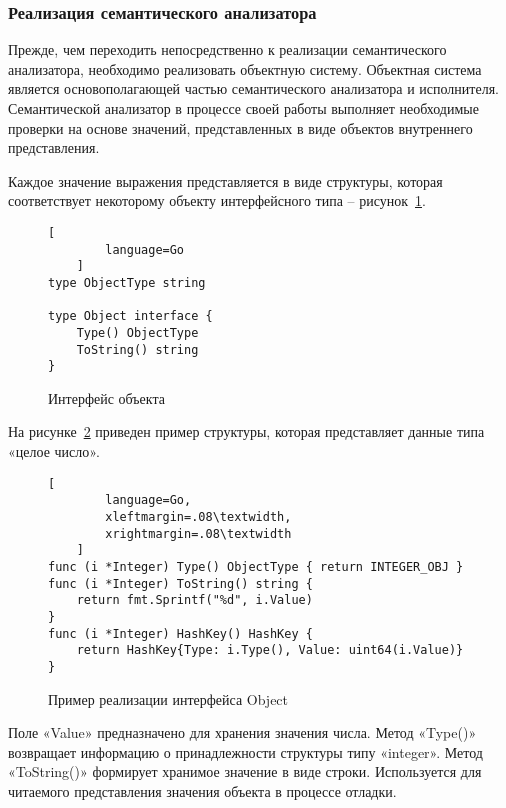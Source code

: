 \subsubsection{Реализация семантического анализатора}

Прежде, чем переходить непосредственно к реализации семантического анализатора, необходимо реализовать объектную систему.
Объектная система является основополагающей частью семантического анализатора и исполнителя.
Семантической анализатор в процессе своей работы выполняет необходимые проверки на основе значений,
представленных в виде объектов внутреннего представления.

Каждое значение выражения представляется в виде структуры, которая соответствует некоторому объекту интерфейсного типа -- рисунок~\ref{f:code_ObjectInterface}.

\begin{figure}[ht]
	\centering
	\vspace{\toppaddingoffigure}
	\begin{lstlisting}[
        language=Go
    ]
type ObjectType string

type Object interface {
    Type() ObjectType
    ToString() string
}
\end{lstlisting}
	\caption{Интерфейс объекта}
	\label{f:code_ObjectInterface}
\end{figure}

На рисунке~\ref{f:code_IObjectExample} приведен пример структуры, которая представляет данные типа «целое число».

\begin{figure}[ht]
	\centering
	\vspace{\toppaddingoffigure}
	\begin{lstlisting}[
        language=Go,
        xleftmargin=.08\textwidth,
        xrightmargin=.08\textwidth
    ]
func (i *Integer) Type() ObjectType { return INTEGER_OBJ }
func (i *Integer) ToString() string {
    return fmt.Sprintf("%d", i.Value)
}
func (i *Integer) HashKey() HashKey {
    return HashKey{Type: i.Type(), Value: uint64(i.Value)}
}
\end{lstlisting}
	\caption{Пример реализации интерфейса Object}
	\label{f:code_IObjectExample}
\end{figure}

Поле «Value» предназначено для хранения значения числа.
Метод «Type()» возвращает информацию о принадлежности структуры типу «integer». 
Метод «ToString()» формирует хранимое значение в виде строки.
Используется для читаемого представления значения объекта в процессе отладки. 

